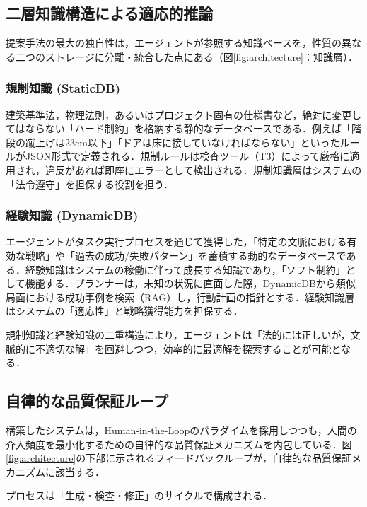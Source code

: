 \documentclass[dvipdfmx, a4paper, 9pt]{deimj}
\begin{document}
\subsection{二層知識構造による適応的推論}

提案手法の最大の独自性は，エージェントが参照する知識ベースを，性質の異なる二つのストレージに分離・統合した点にある（図\ref{fig:architecture}：知識層）．

\subsubsection{規制知識 (StaticDB)}

建築基準法，物理法則，あるいはプロジェクト固有の仕様書など，絶対に変更してはならない「ハード制約」を格納する静的なデータベースである．例えば「階段の蹴上げは23cm以下」「ドアは床に接していなければならない」といったルールがJSON形式で定義される．規制ルールは検査ツール（T3）によって厳格に適用され，違反があれば即座にエラーとして検出される．規制知識層はシステムの「法令遵守」を担保する役割を担う．

\subsubsection{経験知識 (DynamicDB)}

エージェントがタスク実行プロセスを通じて獲得した，「特定の文脈における有効な戦略」や「過去の成功/失敗パターン」を蓄積する動的なデータベースである\cite{wang2023voyager}．経験知識はシステムの稼働に伴って成長する知識であり，「ソフト制約」として機能する．プランナーは，未知の状況に直面した際，DynamicDBから類似局面における成功事例を検索（RAG\cite{lewis2020rag}）し，行動計画の指針とする．経験知識層はシステムの「適応性」と戦略獲得能力を担保する．

規制知識と経験知識の二重構造により，エージェントは「法的には正しいが，文脈的に不適切な解」を回避しつつ，効率的に最適解を探索することが可能となる．

\subsection{自律的な品質保証ループ}

構築したシステムは，Human-in-the-Loopのパラダイムを採用しつつも，人間の介入頻度を最小化するための自律的な品質保証メカニズムを内包している．図\ref{fig:architecture}の下部に示されるフィードバックループが，自律的な品質保証メカニズムに該当する．

プロセスは「生成・検査・修正」のサイクルで構成される．
\end{document}
